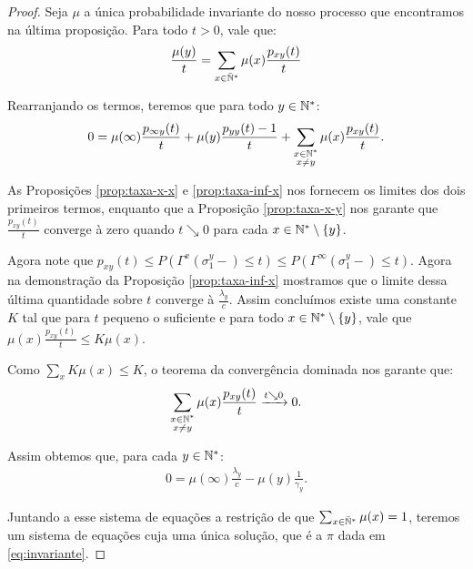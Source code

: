 \begin{proof}
  Seja $\mu$ a única probabilidade invariante do nosso processo que
  encontramos na última proposição. Para todo $t > 0$, vale que:
  \begin{gather*}
    \frac{\mu(y)}{t} = \sum_{x \in {\mathbb{\bar{N}^*}}} \mu(x) \frac{p_{x y}
      (t)}{t}\\
  \end{gather*}

  Rearranjando os termos, teremos que para todo $y \in {\mathbb{N^*}}$:
  \begin{displaymath}
    0 = \mu(\infty) \frac{p_{\infty y}(t)}{t} + 
    \mu(y) \frac{p_{y y}(t) - 1}{t} + 
    \sum_{\substack{x \in {\mathbb{N^*}} \\ x \neq y}} \mu(x) \frac{p_{x
        y}(t)}{t}.
  \end{displaymath}

  As Proposições \ref{prop:taxa-x-x} e \ref{prop:taxa-inf-x} nos
  fornecem os limites dos dois primeiros termos, enquanto que a
  Proposição \ref{prop:taxa-x-y} nos garante que $\frac{p_{x
      y}(t)}{t}$ converge à zero quando $t \searrow 0$ para cada $x
  \in {\mathbb{N^*}} \setminus \{y\}$.

  Agora note que $p_{x y} (t) \leq P(\Gamma^x (\sigma_1^y -) \leq t)
  \leq P(\Gamma^\infty (\sigma_1^y -) \leq t)$. Agora na demonstração
  da Proposição \ref{prop:taxa-inf-x} mostramos que o limite dessa
  última quantidade sobre $t$ converge à $\frac{\lambda_y}{c}$. Assim
  concluímos existe uma constante $K$ tal que para $t$ pequeno o
  suficiente e para todo $x \in {\mathbb{N^*}}\setminus \{ y\}$, vale que
  $\mu(x)\frac{p_{x y}(t)}{t} \leq K \mu(x)$.

  Como $\sum_{x} K \mu(x) \leq K$, o teorema da convergência dominada
  nos garante que:
  \begin{displaymath}
    \sum_{\substack{x \in {\mathbb{N^*}} \\ x \neq y}} \mu(x)
    \frac{p_{x y}(t)}{t} \xrightarrow{t \searrow 0} 0.
  \end{displaymath}

  Assim obtemos que, para cada $y \in {\mathbb{N^*}}$:
  \begin{gather*}
    0 = \mu(\infty) \frac{\lambda_y}{c} - \mu(y) \frac{1}{\gamma_y}.
  \end{gather*}

  Juntando a esse sistema de equações a restrição de que
  $\sum_{x\in{\mathbb{\bar{N}^*}}}\mu(x) = 1$, teremos um sistema de equações cuja uma única
  solução, que é a $\pi$ dada em \eqref{eq:invariante}.
\end{proof}

